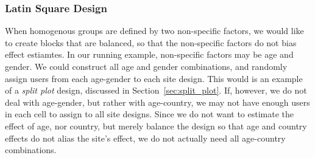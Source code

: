 \documentclass[12pt,a4paper]{report}
\theoremstyle{plain}
\theoremstyle{definition}
\begin{document}
\subsubsection{Latin Square Design}
When homogenous groups are defined by two non-specific factors, we would like to create blocks that are balanced, so that the non-specific factors do not bias effect estiamtes.
In our running example, non-specific factors may be age and gender. 
We could construct all age and gender combinations, and randomly assign users from each age-gender to each site design.
This would is an example of a \emph{split plot} design, discussed in Section~\ref{sec:split_plot}.
If, however, we do not deal with age-gender, but rather with age-country, we may not have enough users in each cell to assign to all site designs. 
Since we do not want to estimate the effect of age, nor country, but merely balance the design so that age and country effects do not alias the site's effect, we do not actually need all age-country combinations. 
\end{document}
